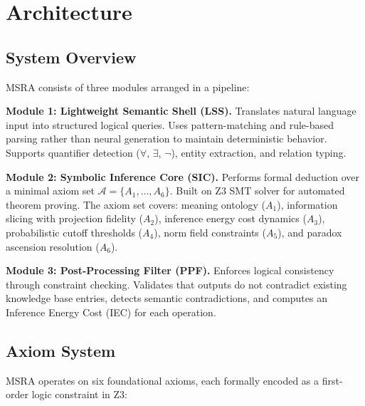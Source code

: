 \documentclass[11pt,a4paper]{article}
\begin{document}
\section{Architecture}\label{sec:architecture}

\subsection{System Overview}

MSRA consists of three modules arranged in a pipeline:

\begin{center}
\end{center}

\textbf{Module 1: Lightweight Semantic Shell (LSS).} Translates natural language input into structured logical queries. Uses pattern-matching and rule-based parsing rather than neural generation to maintain deterministic behavior. Supports quantifier detection ($\forall$, $\exists$, $\neg$), entity extraction, and relation typing.

\textbf{Module 2: Symbolic Inference Core (SIC).} Performs formal deduction over a minimal axiom set $\mathcal{A} = \{A_1,\dots,A_6\}$. Built on Z3 SMT solver for automated theorem proving. The axiom set covers: meaning ontology ($A_1$), information slicing with projection fidelity ($A_2$), inference energy cost dynamics ($A_3$), probabilistic cutoff thresholds ($A_4$), norm field constraints ($A_5$), and paradox ascension resolution ($A_6$).

\textbf{Module 3: Post-Processing Filter (PPF).} Enforces logical consistency through constraint checking. Validates that outputs do not contradict existing knowledge base entries, detects semantic contradictions, and computes an Inference Energy Cost (IEC) for each operation.

\subsection{Axiom System}

MSRA operates on six foundational axioms, each formally encoded as a first-order logic constraint in Z3:
\end{document}
